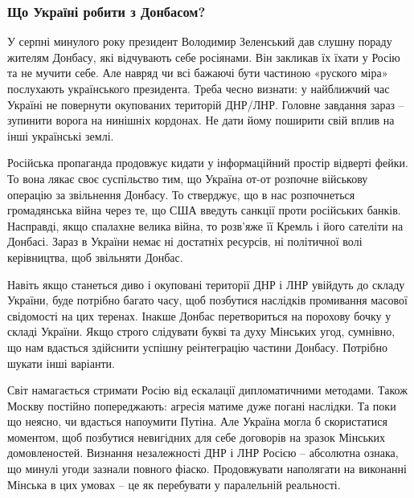  
 
 
 
 

\subsubsection{Що Україні робити з Донбасом?}

У серпні минулого року президент Володимир Зеленський дав слушну пораду жителям
Донбасу, які відчувають себе росіянами. Він закликав їх їхати у Росію та не
мучити себе. Але навряд чи всі бажаючі бути частиною «руского міра» послухають
українського президента. Треба чесно визнати: у найближчий час Україні не
повернути окупованих територій ДНР/ЛНР. Головне завдання зараз – зупинити
ворога на нинішніх кордонах. Не дати йому поширити свій вплив на інші
українські землі.

Російська пропаганда продовжує кидати у інформаційний простір відверті фейки.
То вона лякає своє суспільство тим, що Україна от-от розпочне військову
операцію за звільнення Донбасу. То стверджує, що в нас розпочнеться
громадянська війна через те, що США введуть санкції проти російських банків.
Насправді, якщо спалахне велика війна, то розв’яже її Кремль і його сателіти на
Донбасі. Зараз в України немає ні достатніх ресурсів, ні політичної волі
керівництва, щоб звільняти Донбас.


Навіть якщо станеться диво і окуповані території ДНР і ЛНР увійдуть до складу
України, буде потрібно багато часу, щоб позбутися наслідків промивання масової
свідомості на цих теренах. Інакше Донбас перетвориться на порохову бочку у
складі України. Якщо строго слідувати букві та духу Мінських угод, сумнівно, що
нам вдасться здійснити успішну реінтеграцію частини Донбасу. Потрібно шукати
інші варіанти.

Світ намагається стримати Росію від ескалації дипломатичними методами. Також
Москву постійно попереджають: агресія матиме дуже погані наслідки. Та поки що
неясно, чи вдасться напоумити Путіна. Але Україна могла б скористатися
моментом, щоб позбутися невигідних для себе договорів на зразок Мінських
домовленостей. Визнання незалежності ДНР і ЛНР Росією – абсолютна ознака, що
минулі угоди зазнали повного фіаско. Продовжувати наполягати на виконанні
Мінська в цих умовах – це як перебувати у паралельній реальності.

